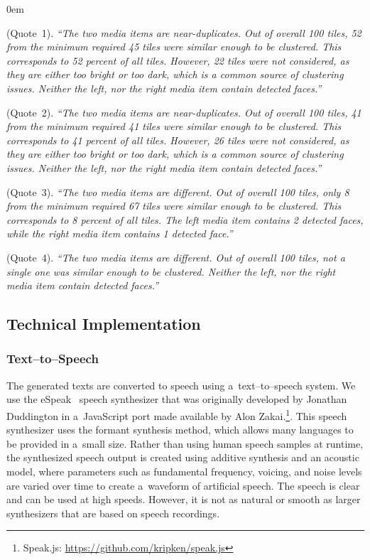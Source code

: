 \documentclass{article}
\begin{document}
\begin{description}
  \itemsep0em
  \item[Clustering Consent] (Quote~1). \textit{``The two media items are near-duplicates. Out of overall 100 tiles, 52 from the minimum required 45 tiles
      were similar enough to be clustered. This corresponds to 52 percent of all tiles. However, 22 tiles were not considered, as they are either too bright or too dark, which is a common source of clustering issues. Neither the left, nor the right media item contain detected faces.''}
  \item[Clustering Dissent] (Quote~2). \textit{``The two media items are near-duplicates. Out of overall 100 tiles, 41 from the minimum required 41 tiles were similar enough to be clustered. This corresponds to 41 percent of all tiles. However, 26 tiles were not considered, as they are either too bright
      or too dark, which is a common source of clustering issues. Neither the left, nor the right media item contain detected faces.''}
  \item[Non-Clustering Dissent] (Quote~3). \textit{``The two media items are different. Out of overall 100 tiles, only 8 from the minimum required 67 tiles
      were similar enough to be clustered. This corresponds to 8 percent of all tiles. The left media item contains 2 detected faces, while the right media item contains 1 detected face.''}
  \item[(Non-Clustering Consent)] (Quote~4). \textit{``The two media items are different. Out of overall 100 tiles, not a single one was similar enough to be clustered. Neither the left, nor the right media item contain detected faces.''}
\end{description}

\subsection{Technical Implementation}

\subsubsection{Text--to--Speech}
The generated texts are converted to speech using a~text--to--speech system. We use the eSpeak~\cite{duddington2012espeak} speech synthesizer that was originally developed by Jonathan Duddington in a~JavaScript port made available by Alon Zakai.\footnote{Speak.js: \url{https://github.com/kripken/speak.js}}. This speech synthesizer uses the formant synthesis method, which allows many languages to be provided in a~small size. Rather than using human speech samples at runtime, the synthesized speech output is created using additive synthesis and an acoustic model, where parameters such as fundamental frequency, voicing, and noise levels
are varied over time to create a~waveform of artificial speech. The speech is clear and can be used at high speeds. However, it is not as natural or smooth as larger synthesizers that are based on speech recordings.
\end{document}
